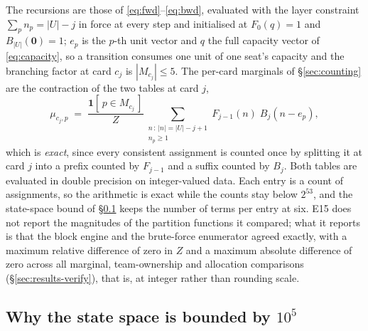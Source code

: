 The recursions are those of \eqref{eq:fwd}--\eqref{eq:bwd}, evaluated with the
layer constraint $\sum_p n_p = |U| - j$ in force at every step and initialised at
$F_0(q) = 1$ and $B_{|U|}(\mathbf{0}) = 1$; $e_p$ is the $p$-th unit vector and
$q$ the full capacity vector of \eqref{eq:capacity}, so a transition consumes one
unit of one seat's capacity and the branching factor at card $c_j$ is
$|M_{c_j}| \le 5$. The per-card marginals of
\S\ref{sec:counting} are the contraction of the two tables at card $j$,
\begin{equation}
  \mu_{c_j, p}
    \;=\; \frac{\mathbf{1}[\,p \in M_{c_j}\,]}{Z}
      \sum_{\substack{n \,:\, |n| = |U| - j + 1 \\ n_p \ge 1}}
        F_{j-1}(n)\; B_j(n - e_p),
  \label{eq:marg}
\end{equation}
which is \emph{exact}, since every consistent assignment is counted once by
splitting it at card $j$ into a prefix counted by $F_{j-1}$ and a suffix counted
by $B_j$. Both tables are evaluated in double
precision on integer-valued data. Each entry is a count of assignments, so the
arithmetic is exact while the counts stay below $2^{53}$, and the state-space
bound of \S\ref{app:bound} keeps the number of terms per entry at six. E15 does
not report the magnitudes of the partition functions it compared; what it
reports is that the block engine and the brute-force enumerator agreed exactly,
with a maximum relative difference of zero in $Z$ and a maximum absolute
difference of zero across all \numOracleMargChecks{} marginal,
\numOracleTeamChecks{} team-ownership and \numOracleAllocChecks{} allocation
comparisons (\S\ref{sec:results-verify}), that is, at integer rather than
rounding scale.

\subsection{Why the state space is bounded by $10^5$}
\label{app:bound}

